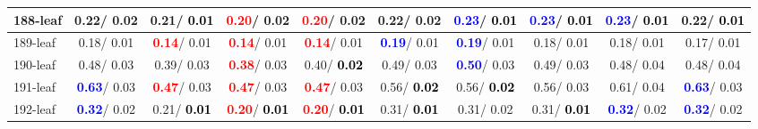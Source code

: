 \begin{table}[h]
\begin{center}
{\begin{tabular}{lc|c|c|c|c|c|c|c|c}
188-leaf &   0.22/  0.02 &   0.21/\textcolor{black}{\textbf{  0.01}} & \textcolor{red}{\textbf{  0.20}}/  0.02 & \textcolor{red}{\textbf{  0.20}}/  0.02 &   0.22/  0.02 & \textcolor{blue}{\textbf{  0.23}}/\textcolor{black}{\textbf{  0.01}} & \textcolor{blue}{\textbf{  0.23}}/\textcolor{black}{\textbf{  0.01}} & \textcolor{blue}{\textbf{  0.23}}/\textcolor{black}{\textbf{  0.01}} &   0.22/\textcolor{black}{\textbf{  0.01}} \\ \hline
189-leaf &   0.18/  0.01 & \textcolor{red}{\textbf{  0.14}}/  0.01 & \textcolor{red}{\textbf{  0.14}}/  0.01 & \textcolor{red}{\textbf{  0.14}}/  0.01 & \textcolor{blue}{\textbf{  0.19}}/  0.01 & \textcolor{blue}{\textbf{  0.19}}/  0.01 &   0.18/  0.01 &   0.18/  0.01 &   0.17/  0.01 \\
190-leaf &   0.48/  0.03 &   0.39/  0.03 & \textcolor{red}{\textbf{  0.38}}/  0.03 &   0.40/\textcolor{black}{\textbf{  0.02}} &   0.49/  0.03 & \textcolor{blue}{\textbf{  0.50}}/  0.03 &   0.49/  0.03 &   0.48/  0.04 &   0.48/  0.04 \\
191-leaf & \textcolor{blue}{\textbf{  0.63}}/  0.03 & \textcolor{red}{\textbf{  0.47}}/  0.03 & \textcolor{red}{\textbf{  0.47}}/  0.03 & \textcolor{red}{\textbf{  0.47}}/  0.03 &   0.56/\textcolor{black}{\textbf{  0.02}} &   0.56/\textcolor{black}{\textbf{  0.02}} &   0.56/  0.03 &   0.61/  0.04 & \textcolor{blue}{\textbf{  0.63}}/  0.03 \\
192-leaf & \textcolor{blue}{\textbf{  0.32}}/  0.02 &   0.21/\textcolor{black}{\textbf{  0.01}} & \textcolor{red}{\textbf{  0.20}}/\textcolor{black}{\textbf{  0.01}} & \textcolor{red}{\textbf{  0.20}}/\textcolor{black}{\textbf{  0.01}} &   0.31/\textcolor{black}{\textbf{  0.01}} &   0.31/  0.02 &   0.31/\textcolor{black}{\textbf{  0.01}} & \textcolor{blue}{\textbf{  0.32}}/  0.02 & \textcolor{blue}{\textbf{  0.32}}/  0.02 \\\end{tabular}}\label{stratsALCKappa5Allallb}
\end{center}
\end{table}
